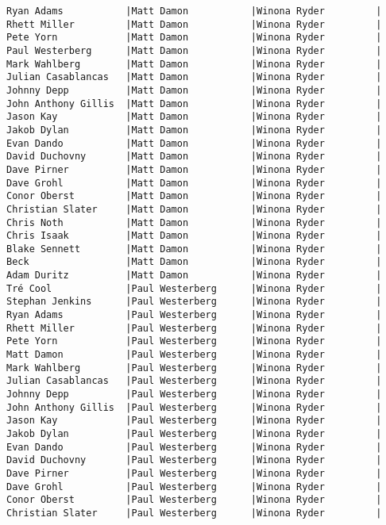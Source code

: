 \documentclass{article}
\begin{document}
\begin{verbatim}
Ryan Adams           |Matt Damon           |Winona Ryder         |
Rhett Miller         |Matt Damon           |Winona Ryder         |
Pete Yorn            |Matt Damon           |Winona Ryder         |
Paul Westerberg      |Matt Damon           |Winona Ryder         |
Mark Wahlberg        |Matt Damon           |Winona Ryder         |
Julian Casablancas   |Matt Damon           |Winona Ryder         |
Johnny Depp          |Matt Damon           |Winona Ryder         |
John Anthony Gillis  |Matt Damon           |Winona Ryder         |
Jason Kay            |Matt Damon           |Winona Ryder         |
Jakob Dylan          |Matt Damon           |Winona Ryder         |
Evan Dando           |Matt Damon           |Winona Ryder         |
David Duchovny       |Matt Damon           |Winona Ryder         |
Dave Pirner          |Matt Damon           |Winona Ryder         |
Dave Grohl           |Matt Damon           |Winona Ryder         |
Conor Oberst         |Matt Damon           |Winona Ryder         |
Christian Slater     |Matt Damon           |Winona Ryder         |
Chris Noth           |Matt Damon           |Winona Ryder         |
Chris Isaak          |Matt Damon           |Winona Ryder         |
Blake Sennett        |Matt Damon           |Winona Ryder         |
Beck                 |Matt Damon           |Winona Ryder         |
Adam Duritz          |Matt Damon           |Winona Ryder         |
Tré Cool             |Paul Westerberg      |Winona Ryder         |
Stephan Jenkins      |Paul Westerberg      |Winona Ryder         |
Ryan Adams           |Paul Westerberg      |Winona Ryder         |
Rhett Miller         |Paul Westerberg      |Winona Ryder         |
Pete Yorn            |Paul Westerberg      |Winona Ryder         |
Matt Damon           |Paul Westerberg      |Winona Ryder         |
Mark Wahlberg        |Paul Westerberg      |Winona Ryder         |
Julian Casablancas   |Paul Westerberg      |Winona Ryder         |
Johnny Depp          |Paul Westerberg      |Winona Ryder         |
John Anthony Gillis  |Paul Westerberg      |Winona Ryder         |
Jason Kay            |Paul Westerberg      |Winona Ryder         |
Jakob Dylan          |Paul Westerberg      |Winona Ryder         |
Evan Dando           |Paul Westerberg      |Winona Ryder         |
David Duchovny       |Paul Westerberg      |Winona Ryder         |
Dave Pirner          |Paul Westerberg      |Winona Ryder         |
Dave Grohl           |Paul Westerberg      |Winona Ryder         |
Conor Oberst         |Paul Westerberg      |Winona Ryder         |
Christian Slater     |Paul Westerberg      |Winona Ryder         |

\end{verbatim}
\end{document}
